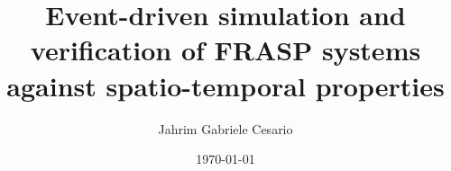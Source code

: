 
\school{\unibo}
\title{
  Event-driven simulation and verification of FRASP systems
  against spatio-temporal properties
}
\author{Jahrim Gabriele Cesario}
\date{\today}
\subject{Pervasive Computing}
